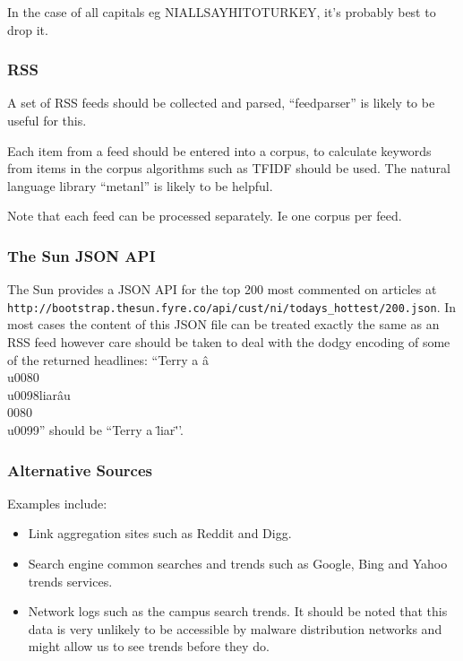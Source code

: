 In the case of all capitals eg NIALLSAYHITOTURKEY, it's probably best to drop it.

\subsubsection{RSS}
A set of RSS feeds should be collected and parsed, ``feedparser'' is likely to be useful for this.

Each item from a feed should be entered into a corpus, to calculate keywords from items in the corpus algorithms such as TFIDF should be used. The natural language library ``metanl'' is likely to be helpful.

Note that each feed can be processed separately. Ie one corpus per feed.

\subsubsection{The Sun JSON API}
The Sun provides a JSON API for the top 200 most commented on articles at \verb`http://bootstrap.thesun.fyre.co/api/cust/ni/todays_hottest/200.json`. In most cases the content of this JSON file can be treated exactly the same as an RSS feed however care should be taken to deal with the dodgy encoding of some of the returned headlines: ``Terry a â\\u0080\\u0098liarâu\\0080\\u0099'' should be ``Terry a \"liar\"''.

\subsubsection{Alternative Sources}
Examples include:
\begin{itemize}
    \item Link aggregation sites such as Reddit and Digg.
    \item Search engine common searches and trends such as Google, Bing and Yahoo trends services.
    \item Network logs such as the campus search trends. It should be noted that this data is very unlikely to be accessible by malware distribution networks and might allow us to see trends before they do.
\end{itemize}

